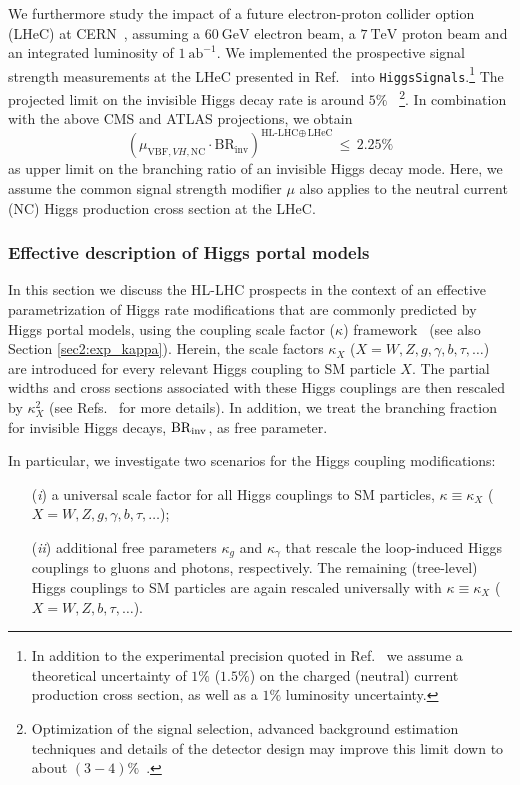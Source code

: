 \documentclass[../report.tex]{subfiles}
\begin{document}
We furthermore study the impact of a future electron-proton collider option (LHeC) at CERN~\cite{AbelleiraFernandez:2012cc,uta,uta2,Zimmermann:2651305}, assuming a $60~\mathrm{GeV}$ electron beam, a $7~\mathrm{TeV}$ proton beam and an integrated luminosity of $1~\mathrm{ab}^{-1}$. We implemented the prospective signal strength measurements at the LHeC presented in Ref.~\cite{uta} into \texttt{HiggsSignals}.\footnote{In addition to the experimental precision quoted in Ref.~\cite{uta} we assume a theoretical uncertainty of $1\%$ ($1.5\%$) on the charged (neutral) current production cross section, as well as a $1\%$ luminosity uncertainty.} The projected limit on the invisible Higgs decay rate is around $5\%$~\cite{uta,Tang:2015uha,kuzeLHeC,bc1,bc2,uta2} \footnote{Optimization of the signal selection, advanced background estimation techniques and details of the detector design may improve this limit down to about $(3-4)\%$~\cite{Utacommunications}.}.
In combination with the above CMS and ATLAS projections, we obtain
\begin{equation*}
\left(\mu_{\text{VBF},VH,\text{NC}} \cdot \text{BR}_\text{inv}\right)^{\text{HL-LHC}\oplus\,\text{LHeC}}\,\leq\,2.25\%
\end{equation*}
as upper limit on the branching ratio of an invisible Higgs decay mode. {Here, {we assume} the common signal strength modifier $\mu$ also applies to the neutral current (NC) Higgs production cross section at the LHeC.}


\subsubsection{Effective description of Higgs portal models}
\label{sec6:effC}

In this section we discuss the HL-LHC prospects in the context of an effective parametrization of Higgs rate modifications that are commonly predicted by Higgs portal models, using the coupling scale factor ($\kappa$) framework~\cite{Heinemeyer:2013tqa} (see also Section \ref{sec2:exp_kappa}).  Herein, the scale factors $\kappa_X$ ($X = W, Z, g, \gamma, b, \tau, \dots$) are introduced for every relevant Higgs coupling to SM particle $X$. The partial widths and cross sections associated with these Higgs couplings are then rescaled by $\kappa^2_X$ (see Refs.~\cite{Heinemeyer:2013tqa,Bechtle:2014ewa} for more details). In addition, we treat the branching fraction for invisible Higgs decays, $\mathrm{BR}_\mathrm{inv}$, as free parameter.

In particular, we investigate two scenarios for the Higgs coupling modifications:
\begin{enumerate}
\item[(\emph{i})] a universal scale factor for all Higgs couplings to SM particles, $\kappa \equiv \kappa_X$ ($X = W, Z, g, \gamma, b, \tau, \dots$);
\item[(\emph{ii})] additional free parameters $\kappa_g$ and $\kappa_\gamma$ that rescale the loop-induced Higgs couplings to gluons and photons, respectively. The remaining (tree-level) Higgs couplings to SM particles are again rescaled universally with $\kappa \equiv  \kappa_X$ ($X = W, Z, b, \tau, \dots$).
\end{enumerate}
\end{document}
